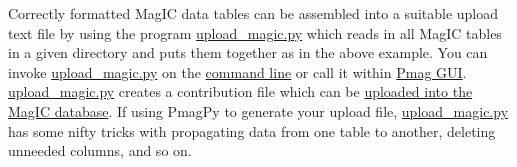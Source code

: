 \documentclass[11pt]{book}
\begin{document}
{{Correctly formatted MagIC data tables can be assembled into a suitable upload text file by using the program \href{#upload_magic.py}{upload\_magic.py} which reads in all MagIC tables in a given directory and puts them together as in the above example.  You can invoke \href{#upload_magic.py}{upload\_magic.py} on the \href{#command_line}{command line} or call it within  \href{#pmag_gui.py}{Pmag GUI}.     \href{#upload_magic.py}{upload\_magic.py} creates a contribution file which can be \href{#magic_upload}{uploaded into the MagIC database}.  If using PmagPy to generate your upload file, \href{#upload_magic.py}{upload\_magic.py} has some nifty tricks with propagating data from one table to another, deleting unneeded columns, and so on.



%
%
%
%
%
%
%
%
%
%
%
%
%
%
%
%
%
%




}}
\end{document}
